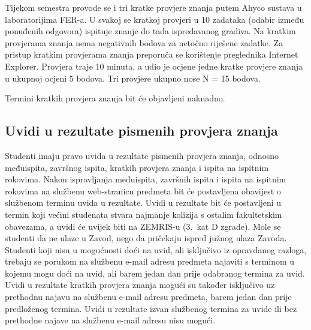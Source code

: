 \documentclass[times, 12pt, utf8]{book}
\begin{document}
Tijekom semestra provode se i tri kratke provjere znanja putem Ahyco sustava u laboratorijima FER-a.
U svakoj se kratkoj provjeri u 10 zadataka (odabir između ponuđenih odgovora) ispituje znanje do tada ispredavanog gradiva.
Na kratkim provjerama znanja nema negativnih bodova za netočno riješene zadatke.
Za pristup kratkim provjerama znanja preporuča se korištenje preglednika Internet Explorer.
Provjera traje 10 minuta, a udio je ocjene jedne kratke provjere znanja u ukupnoj ocjeni 5 bodova.
Tri provjere ukupno nose N = 15 bodova.

Termini kratkih provjera znanja bit će objavljeni naknadno.
\begin{comment}
I.~kratka provjera znanja: 24.~10.~2011.~–- 28.~10.~2011. \\
II.~kratka provjera znanja: 5.~12.~2011.~–- 9.~12.~2011. \\
III.~kratka provjera znanja: 16.~1.~2012.~–- 20.~1.~2012.
\end{comment}

\cleardoublepage  
{}  
{}
\subsection*{Uvidi u rezultate pismenih provjera znanja}

Studenti imaju pravo uvida u rezultate pismenih provjera znanja, odnosno međuispita, završnog ispita, kratkih provjera znanja i ispita na ispitnim rokovima.
Nakon ispravljanja međuispita, završnih ispita i ispita na ispitnim rokovima na službenu web-stranicu predmeta bit će postavljena obavijest o službenom terminu uvida u rezultate.
Uvidi u rezultate bit će postavljeni u termin koji većini studenata stvara najmanje kolizija s ostalim fakultetskim obavezama, a uvidi će uvijek biti na ZEMRIS-u (3.~kat D zgrade).
Mole se studenti da ne ulaze u Zavod, nego da pričekaju ispred južnog ulaza Zavoda.
Studenti koji nisu u mogućnosti doći na uvid, ali isključivo iz opravdanog razloga, trebaju se porukom na službenu e-mail adresu predmeta najaviti s terminom u kojemu mogu doći na uvid, ali barem jedan dan prije odabranog termina za uvid.
Uvidi u rezultate kratkih provjera znanja mogući su također isključivo uz prethodnu najavu na službenu e-mail adresu predmeta, barem jedan dan prije predloženog termina.
Uvidi u rezultate izvan službenog termina za uvide ili bez prethodne najave na službenu e-mail adresu nisu mogući.

\cleardoublepage  
{}  
{}
\end{document}
